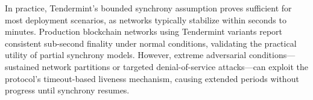 In practice, Tendermint's bounded synchrony assumption proves sufficient for most deployment scenarios, as networks typically stabilize within seconds to minutes. Production blockchain networks using Tendermint variants report consistent sub-second finality under normal conditions, validating the practical utility of partial synchrony models. However, extreme adversarial conditions---sustained network partitions or targeted denial-of-service attacks---can exploit the protocol's timeout-based liveness mechanism, causing extended periods without progress until synchrony resumes.